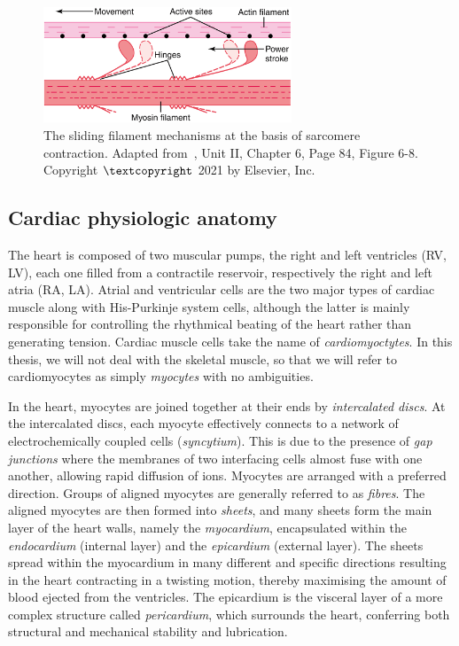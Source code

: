 \begin{figure}[!ht]
    \myfloatalign
    \includegraphics[width=0.66\textwidth]{figures/chapter01/fig10.png}
    \caption{The sliding filament mechanisms at the basis of sarcomere contraction. Adapted from~\cite{Guyton:2021}, Unit II, Chapter 6, Page 84, Figure 6-8. Copyright $\textcopyright$ 2021 by Elsevier, Inc.}
    \label{fig:powerstroke}
\end{figure}


%
%
%
\subsection{Cardiac physiologic anatomy}\label{sec:ch1cardiac_physiologic_anatomy}
The heart is composed of two muscular pumps, the right and left ventricles (\acs{RV}, \acs{LV}), each one filled from a contractile reservoir, respectively the right and left atria (\acs{RA}, \acs{LA}). Atrial and ventricular cells are the two major types of cardiac muscle along with His-Purkinje system cells, although the latter is mainly responsible for controlling the rhythmical beating of the heart rather than generating tension. Cardiac muscle cells take the name of \textit{cardiomyoctytes}. In this thesis, we will not deal with the skeletal muscle, so that we will refer to cardiomyocytes as simply \textit{myocytes} with no ambiguities.

\vspace{0.2cm}
In the heart, myocytes are joined together at their ends by \textit{intercalated discs}. At the intercalated discs, each myocyte effectively connects to a network of electrochemically coupled cells (\textit{syncytium}). This is due to the presence of \textit{gap junctions} where the membranes of two interfacing cells almost fuse with one another, allowing rapid diffusion of ions. Myocytes are arranged with a preferred direction. Groups of aligned myocytes are generally referred to as \textit{fibres}. The aligned myocytes are then formed into \textit{sheets}, and many sheets form the main layer of the heart walls, namely the \textit{myocardium}, encapsulated within the \textit{endocardium} (internal layer) and the \textit{epicardium} (external layer). The sheets spread within the myocardium in many different and specific directions resulting in the heart contracting in a twisting motion, thereby maximising the amount of blood ejected from the ventricles. The epicardium is the visceral layer of a more complex structure called \textit{pericardium}, which surrounds the heart, conferring both structural and mechanical stability and lubrication.

